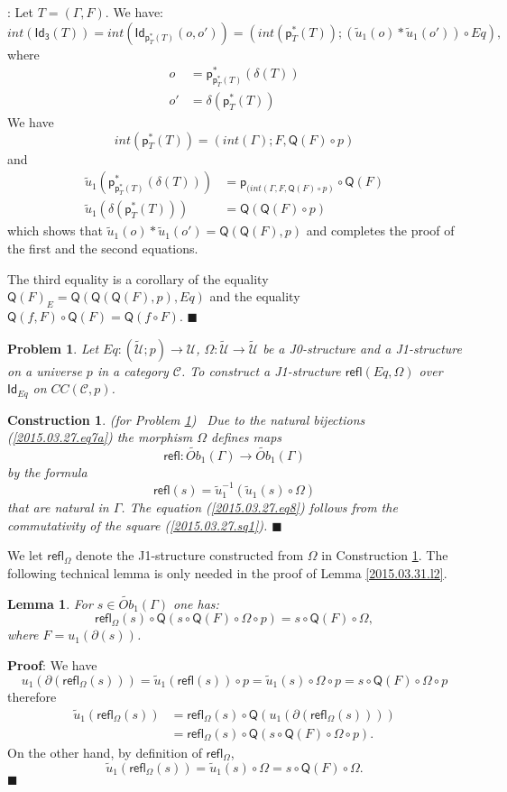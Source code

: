 \documentclass[12pt]{article}
\numberwithin{equation}{section}
\newenvironment{myproof}{{\bf Proof}:}{$\blacksquare$ \vskip 5mm }
\newtheorem{lemma}[proposition]{Lemma}
\newtheorem{problem}[proposition]{Problem}
\newtheorem{construction0}[proposition]{Construction}
\newenvironment{construction}[1]{\begin{construction0}(for Problem \ref{#1})\ }{$\blacksquare$ \end{construction0}}
\newcommand{\sr}{\rightarrow}
\newcommand{\wt}{\widetilde}
\newcommand{\toCC}{CC} %
\newcommand{\C}{{\mathcal C}}  %
\newcommand{\p}{\mathsf{p}}
\newcommand{\Id}{\mathsf{Id}} %
\newcommand{\Idx}{\mathsf{Id_3}} %
\newcommand{\refl}{\mathsf{refl}}
\newcommand{\U}{\mathcal{U}}
\newcommand{\Q}{\mathsf{Q}}
\newcommand{\Obwt}{\wt{Ob}}
\begin{document}
%
\begin{myproof}
Let $T=(\Gamma,F)$. We have:
%
$$int(\Idx(T))=int(\Id_{\p_T^*(T)}(o,o'))=(int(\p_T^*(T));(\wt{u}_1(o)*\wt{u}_1(o'))\circ
Eq),$$
%
where
%
\begin{align*}
  o &=\p_{\p_T^*(T)}^*(\delta(T)) \\
  o'&=\delta(\p_T^*(T))
\end{align*}
%
We have
%
$$int(\p_T^*(T))=(int(\Gamma);F,\Q(F)\circ p)$$
%
and
%
\begin{align*}
  \wt{u}_1(\p_{\p_T^*(T)}^*(\delta(T)))&=\p_{(int(\Gamma,F, \Q(F)\circ p)}\circ \Q(F) \\
  \wt{u}_1(\delta(\p_T^*(T)))&=\Q(\Q(F)\circ p)
\end{align*}
%
which shows that $\wt{u}_1(o)*\wt{u}_1(o')=\Q(\Q(F),p)$ and completes the proof
of the first and the second equations.

The third equality is a corollary of the equality $\Q(F)_{E}=\Q(\Q(\Q(F),p),Eq)$
and the equality $\Q(f,F)\circ \Q(F)=\Q(f\circ F)$.
\end{myproof}
%
\begin{problem}
\label{2015.03.27.prob4} Let $Eq:(\wt{\U};p)\sr \U$, $\Omega:\wt{\U}\sr \wt{\U}$
be a J0-structure and a J1-structure on a universe $p$ in a category $\C$.
To construct a J1-structure $\refl(Eq,\Omega)$ over $\Id_{Eq}$ on $\toCC({\C},p)$.
\end{problem}
%
\begin{construction}{2015.03.27.prob4}\rm
\label{2015.03.27.constr4} Due to the natural bijections
(\ref{2015.03.27.eq7a}) the morphism $\Omega$ defines maps
%
$$\refl:\Obwt_1(\Gamma)\sr \Obwt_1(\Gamma)$$
%
by the formula
%
$$\refl(s)=\wt{u}_1^{-1}(\wt{u}_1(s)\circ \Omega)$$
%
that are natural in $\Gamma$. The equation (\ref{2015.03.27.eq8}) follows from
the commutativity of the square (\ref{2015.03.27.sq1}).
\end{construction}
%
We let $\refl_{\Omega}$ denote the J1-structure constructed from $\Omega$ in
Construction \ref{2015.03.27.constr4}.
%
The following technical lemma is only needed in the proof of Lemma
\ref{2015.03.31.l2}.
%
\begin{lemma}
\label{2015.04.02.l3} For $s\in \Obwt_1(\Gamma)$ one has:
%
$$\refl_{\Omega}(s)\circ \Q(s\circ \Q(F)\circ \Omega\circ p)=s\circ \Q(F)\circ
\Omega,$$
%
where $F=u_1(\partial(s))$.
\end{lemma}
%
\begin{myproof}
We have
%
$$u_1(\partial(\refl_{\Omega}(s)))=\wt{u}_1(\refl(s))\circ p=\wt{u}_1(s)\circ
\Omega\circ p=s\circ \Q(F)\circ \Omega\circ p$$
%
therefore
%
\begin{align*}
  \wt{u}_1(\refl_{\Omega}(s))
  & =\refl_{\Omega}(s)\circ \Q(u_1(\partial(\refl_{\Omega}(s)))) \\
  & = \refl_{\Omega}(s)\circ \Q(s\circ \Q(F)\circ \Omega\circ p).
\end{align*}
%
On the other hand, by definition of $\refl_{\Omega}$,
%
$$\wt{u}_1(\refl_{\Omega}(s))=\wt{u}_1(s)\circ \Omega=s\circ \Q(F)\circ \Omega.$$
%
\end{myproof}
\end{document}
